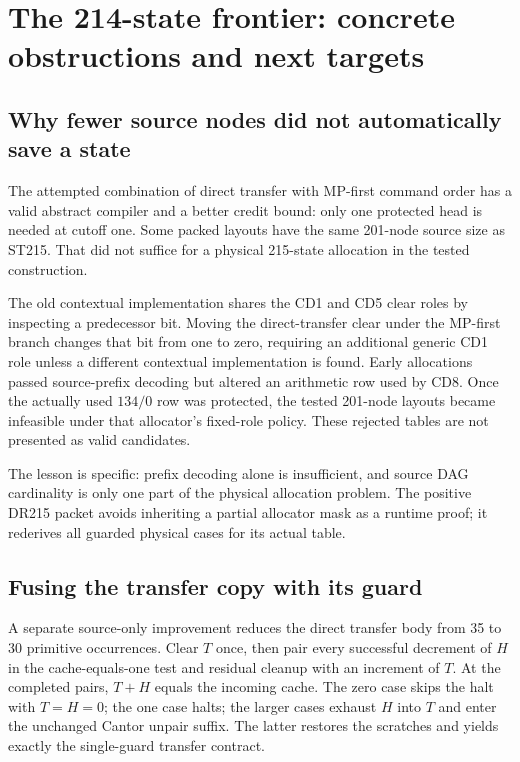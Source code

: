 \documentclass[11pt,a4paper]{article}
\theoremstyle{definition}
\numberwithin{equation}{section}
\begin{document}
\section{The 214-state frontier: concrete obstructions and next targets}
\label{sec:frontier}

\subsection{Why fewer source nodes did not automatically save a state}

The attempted combination of direct transfer with MP-first command order
has a valid abstract compiler and a better credit bound: only one
protected head is needed at cutoff one. Some packed layouts have the
same 201-node source size as ST215. That did not suffice for a physical
215-state allocation in the tested construction.

The old contextual implementation shares the CD1 and CD5 clear roles by
inspecting a predecessor bit. Moving the direct-transfer clear under the
MP-first branch changes that bit from one to zero, requiring an additional
generic CD1 role unless a different contextual implementation is found.
Early allocations passed source-prefix decoding but altered an arithmetic
row used by CD8. Once the actually used $134/0$ row was protected, the
tested 201-node layouts became infeasible under that allocator's fixed-role
policy. These rejected tables are not presented as valid candidates.

The lesson is specific: prefix decoding alone is insufficient, and source
DAG cardinality is only one part of the physical allocation problem.
The positive DR215 packet avoids inheriting a partial allocator mask as a
runtime proof; it rederives all guarded physical cases for its actual table.

\subsection{Fusing the transfer copy with its guard}

A separate source-only improvement reduces the direct transfer body from
35 to 30 primitive occurrences. Clear $T$ once, then pair every successful
decrement of $H$ in the cache-equals-one test and residual cleanup with
an increment of $T$. At the completed pairs, $T+H$ equals the incoming
cache. The zero case skips the halt with $T=H=0$; the one case halts;
the larger cases exhaust $H$ into $T$ and enter the unchanged Cantor
unpair suffix. The latter restores the scratches and yields exactly the
single-guard transfer contract.
\end{document}
